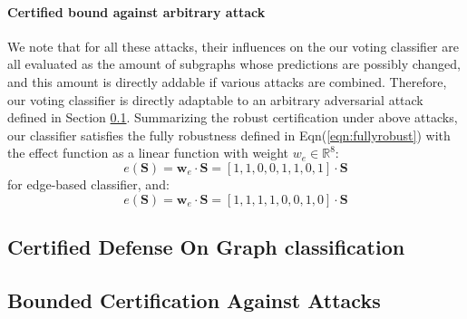 \paragraph{Certified bound against arbitrary attack}
We note that for all these attacks, their influences on the our voting classifier are all evaluated as the amount of subgraphs whose predictions are possibly changed, and this amount is directly addable if various attacks are combined. Therefore, our voting classifier is directly adaptable to an arbitrary adversarial attack defined in Section \ref{}. Summarizing the robust certification under above attacks, our classifier satisfies the fully robustness defined in Eqn(\ref{eqn:fullyrobust}) with the effect function as a linear function with weight $w_{e}\in\mathbb{R}^{8}$:
\begin{equation}
    e(\mathbf{S})=\mathbf{w}_{e}\cdot \mathbf{S}=[1,1,0,0,1,1,0,1] \cdot \mathbf{S}
\end{equation}
for edge-based classifier, and:
\begin{equation}
    e(\mathbf{S})=\mathbf{w}_{e}\cdot \mathbf{S}=[1,1,1,1,0,0,1,0] \cdot \mathbf{S}
\end{equation}

\subsection{Certified Defense On Graph classification}



\subsection{Bounded Certification Against  Attacks}
\label{Sec:Certification}
